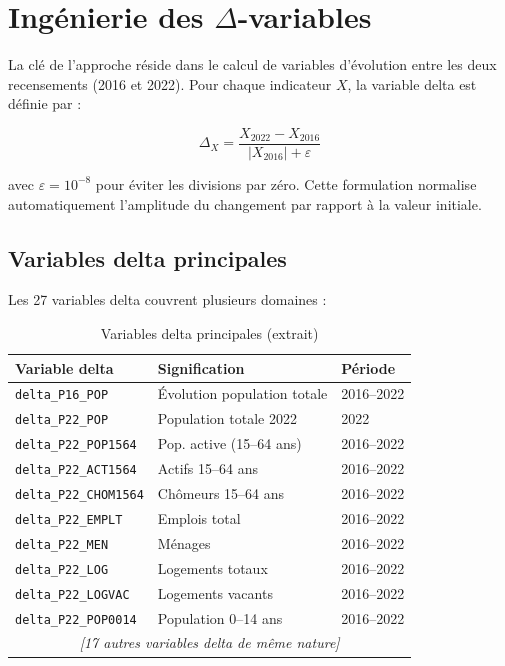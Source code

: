 \section{Ingénierie des \texorpdfstring{$\Delta$}{Delta}-variables}

La clé de l'approche réside dans le calcul de variables d'évolution entre les deux
recensements (2016 et 2022). Pour chaque indicateur $X$, la variable delta est définie
par :

\begin{equation}
\Delta_X = \frac{X_{2022} - X_{2016}}{|X_{2016}| + \varepsilon}
\label{eq:delta}
\end{equation}

avec $\varepsilon = 10^{-8}$ pour éviter les divisions par zéro. Cette formulation
normalise automatiquement l'amplitude du changement par rapport à la valeur initiale.

\subsection{Variables delta principales}

Les 27 variables delta couvrent plusieurs domaines :

\begin{table}[H]
\centering
\caption{Variables delta principales (extrait)}
\label{tab:delta}
\begin{tabular}{lll}
\toprule
\textbf{Variable delta} & \textbf{Signification} & \textbf{Période} \\
\midrule
\texttt{delta\_P16\_POP}    & Évolution population totale     & 2016--2022 \\
\texttt{delta\_P22\_POP}    & Population totale 2022          & 2022 \\
\texttt{delta\_P22\_POP1564}& Pop. active (15--64 ans)        & 2016--2022 \\
\texttt{delta\_P22\_ACT1564}& Actifs 15--64 ans               & 2016--2022 \\
\texttt{delta\_P22\_CHOM1564}& Chômeurs 15--64 ans             & 2016--2022 \\
\texttt{delta\_P22\_EMPLT}  & Emplois total                   & 2016--2022 \\
\texttt{delta\_P22\_MEN}    & Ménages                         & 2016--2022 \\
\texttt{delta\_P22\_LOG}    & Logements totaux                & 2016--2022 \\
\texttt{delta\_P22\_LOGVAC} & Logements vacants               & 2016--2022 \\
\texttt{delta\_P22\_POP0014}& Population 0--14 ans            & 2016--2022 \\
\multicolumn{3}{c}{\textit{[17 autres variables delta de même nature]}} \\
\bottomrule
\end{tabular}
\end{table}

